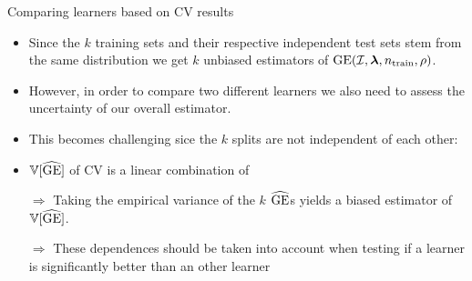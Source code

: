 \documentclass[11pt,compress,t,notes=noshow, xcolor=table]{beamer}
\begin{document}
\begin{vbframe}{Comparing learners based on CV results}
\begin{footnotesize}
\begin{itemize}
\item Since the $k$ training sets and their respective independent test sets stem
from the same distribution we get $k$ unbiased estimators of $\mathrm{GE}(\mathcal{I}, \bm{\lambda}, n_{\mathrm{train}}, \rho)$.
\item However, in order to compare two different learners we also need to assess the 
uncertainty of our overall  estimator.
\item This becomes challenging sice the $k$ splits are not independent of each other: 
\item $\mathbb{V}[\widehat{\mathrm{GE}}]$ of CV is a linear combination of 
\begin{itemize}
\end{itemize}
\item[$\Rightarrow$] Taking the empirical variance of the $k$ $\widehat{\mathrm{GE}}$s yields a biased 
estimator of $\mathbb{V}[\widehat{\mathrm{GE}}]$.
\item[$\Rightarrow$] These dependences should be taken into account 
when testing if a learner is significantly better than an other learner 

\end{itemize}
\end{footnotesize}
\end{vbframe}

\end{document}
